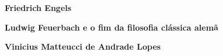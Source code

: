 \textbf{Friedrich Engels} \lipsum[1]

\textbf{Ludwig Feuerbach e o fim da filosofia clássica alemã} \lipsum[2]
        
\textbf{Vinicius Matteucci de Andrade Lopes} \lipsum[3]
